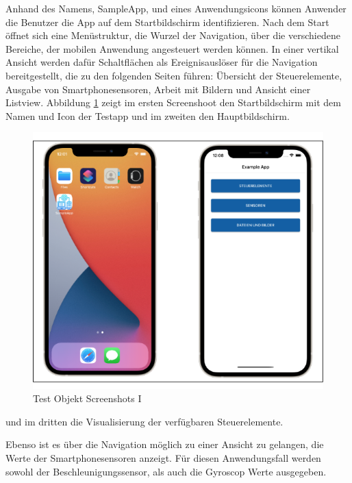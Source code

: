 Anhand des Namens,  SampleApp,  und eines Anwendungsicons können Anwender die Benutzer die App auf dem Startbildschirm identifizieren.  Nach dem Start öffnet sich eine Menüstruktur,  die Wurzel der Navigation, über die verschiedene Bereiche, der mobilen Anwendung angesteuert werden können.  In einer vertikal Ansicht werden dafür Schaltflächen als Ereignisauslöser für die Navigation bereitgestellt,  die zu den folgenden Seiten führen: Übersicht der Steuerelemente,  Ausgabe von Smartphonesensoren,  Arbeit mit Bildern und Ansicht einer Listview. 
Abbildung \ref{fig:TestObjectI} zeigt im ersten Screenshoot den Startbildschirm mit dem Namen und Icon der Testapp und im zweiten den Hauptbildschirm.  

\newpage
\begin{figure}[!ht]
 \includegraphics[width=\textwidth,keepaspectratio]{Images/Screenshot/AppIconAndMenu.png}
 \caption{Test Objekt Screenshots I}
 \label{fig:TestObjectI}
\end{figure}



und im dritten die Visualisierung der verfügbaren Steuerelemente.


Ebenso ist es über die Navigation möglich zu einer Ansicht zu gelangen,  die 
 Werte der Smartphonesensoren anzeigt.  Für diesen Anwendungsfall werden sowohl der Beschleunigungssensor,  als auch die Gyroscop Werte ausgegeben.
 
 
 
